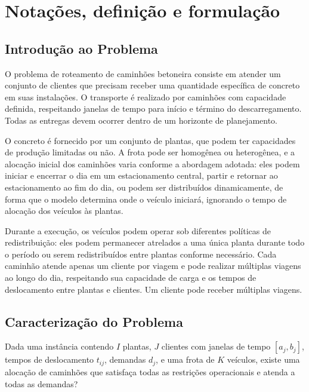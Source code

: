 \chapter{Notações, definição e formulação}
\label{sec:model}



\section{Introdu\c{c}\~{a}o ao Problema}

O problema de roteamento de caminh\~{o}es betoneira consiste em atender um conjunto de clientes que precisam receber uma quantidade espec\'{i}fica de concreto em suas instala\c{c}\~{o}es. O transporte \'{e} realizado por caminh\~{o}es com capacidade definida, respeitando janelas de tempo para in\'{i}cio e t\'{e}rmino do descarregamento. Todas as entregas devem ocorrer dentro de um horizonte de planejamento.

O concreto \'{e} fornecido por um conjunto de plantas, que podem ter capacidades de produ\c{c}\~{a}o limitadas ou n\~{a}o. A frota pode ser homog\^{e}nea ou heterog\^{e}nea, e a aloca\c{c}\~{a}o inicial dos caminh\~{o}es varia conforme a abordagem adotada: eles podem iniciar e encerrar o dia em um estacionamento central, partir e retornar ao estacionamento ao fim do dia, ou podem ser distribu\'{i}dos dinamicamente, de forma que o modelo determina onde o ve\'{i}culo iniciar\'{a}, ignorando o tempo de aloca\c{c}\~{a}o dos ve\'{i}culos \`{a}s plantas.

Durante a execu\c{c}\~{a}o, os ve\'{i}culos podem operar sob diferentes pol\'{i}ticas de redistribui\c{c}\~{a}o: eles podem permanecer atrelados a uma \'{u}nica planta durante todo o per\'{i}odo ou serem redistribu\'{i}dos entre plantas conforme necess\'{a}rio. Cada caminh\~{a}o atende apenas um cliente por viagem e pode realizar m\'{u}ltiplas viagens ao longo do dia, respeitando sua capacidade de carga e os tempos de deslocamento entre plantas e clientes. Um cliente pode receber m\'{u}ltiplas viagens.

\section*{Caracteriza\c{c}\~{a}o do Problema}

Dada uma inst\^{a}ncia contendo $I$ plantas, $J$ clientes com janelas de tempo $[a_j, b_j]$, tempos de deslocamento $t_{ij}$, demandas $d_j$, e uma frota de $K$ ve\'{i}culos, existe uma aloca\c{c}\~{a}o de caminh\~{o}es que satisfa\c{c}a todas as restri\c{c}\~{o}es operacionais e atenda a todas as demandas?

